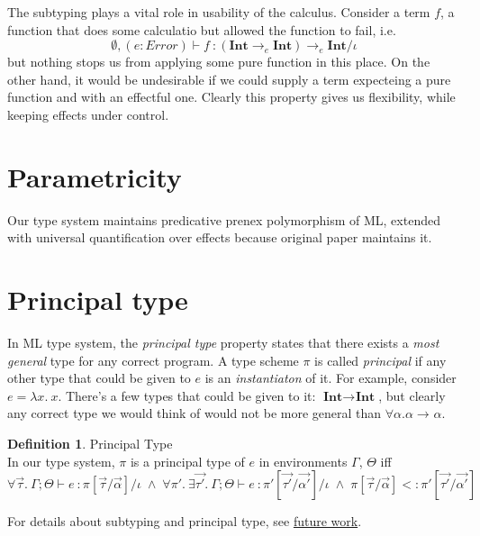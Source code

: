 \documentclass[declaration,shortabstract]{iithesis}
\theoremstyle{definition} \newtheorem{definition}{Definition}[section]
\newcommand{\types}[4][\Gamma;\Theta]{\ensuremath{{{#1} \vdash {#2} \: : {#3}/{#4}}}}
\newcommand{\arrow}[3]{{#1}\rightarrow_{#2}{#3}}
\newcommand{\lam}[1][x]{\ensuremath{\lambda #1.\:}}
\begin{document}
The subtyping plays a vital role in usability of the calculus.
Consider a term $f$, a function that does some calculatio
but allowed the function to fail, i.e.
$$
\types[\emptyset, (e: Error)]
    {f}
    {\arrow{(\arrow{\textbf{Int}}{e}{\textbf{Int}})}{e}{\textbf{Int}}}
    {\iota}
$$
but nothing stops us from applying some pure function in this place.
On the other hand, it would be undesirable if we could supply a term expecteing
a pure function and with an effectful one.
Clearly this property gives us flexibility, while keeping effects under control.


\section{Parametricity}
Our type system maintains predicative prenex polymorphism of ML,
extended with universal quantification over effects because original paper maintains it.


\section{Principal type}
In ML type system, the \textit{principal type} property states that there exists
a \textit{most general} type for any correct program\cite{principal}. 
A type scheme $\pi$ is called \textit{principal} if any other type that
could be given to $e$ is an \textit{instantiaton} of it.
For example, consider $e = \lam x$.
There's a few types that could be given to it: $\arrow{\textbf{Int}}{}{\textbf{Int}}$, 
but clearly any correct type we would think of would not be more general than $\forall \alpha . \arrow{\alpha}{}{\alpha}$.

\theoremstyle{definition}
\begin{definition}{Principal Type}
\\
In our type system, $\pi$ is a principal type of $e$ in environments $\Gamma$, $\Theta$ iff
$$ \forall \vec{\tau}. \: \types{e}{\pi[\vec{\tau} / \vec{\alpha}]}{\iota} \;\wedge\;
    \forall \pi'.\:\exists \vec{\tau'}.\: \types{e}{\pi'[\vec{\tau'} / \vec{\alpha'}]}{\iota} \;\wedge\; 
    \pi[\vec{\tau} / \vec{\alpha}] <: \pi'[\vec{\tau'} / \vec{\alpha'}]
$$
\end{definition}
For details about subtyping and principal type, see \hyperlink{chapter.6}{future work}.
\end{document}
